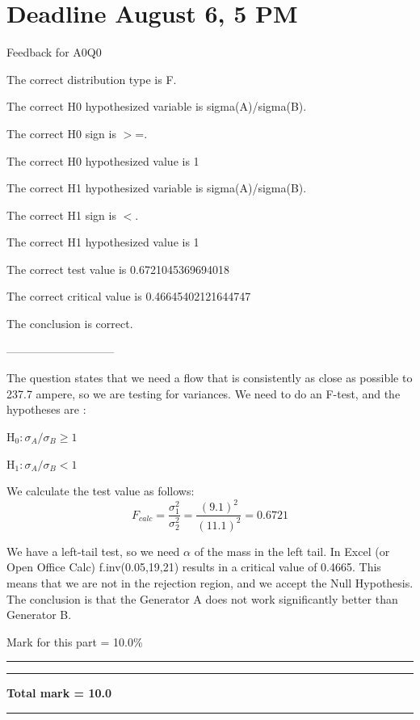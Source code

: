 \documentclass[a4paper,12pt]{CURSUS}
\begin{document}
\addtocounter{chapter}{-1}
\renewcommand{\chaptername}{Practice Class Assignment}
\chapter{Deadline August 6, 5 PM}

 Feedback for A0Q0

 The correct distribution type is F.

 The correct H0 hypothesized variable is sigma(A)/sigma(B).

 The correct H0 sign is $>$=.

 The correct H0 hypothesized value is 1

 The correct H1 hypothesized variable is sigma(A)/sigma(B).

 The correct H1 sign is $<$.

 The correct H1 hypothesized value is 1

 The correct test value is 0.6721045369694018

 The correct critical value is 0.46645402121644747

 The conclusion is correct.


 



 -----------------------------


 The question states that we need a flow that is consistently as close as possible to 237.7 ampere, so we are testing for variances.  We need to do an F-test, and the hypotheses are :

 H$_0:\sigma_A/\sigma_B \geq 1$

 H$_1:\sigma_A/\sigma_B < 1$

 We calculate the test value as follows:\begin{equation}F_{calc}=\displaystyle \frac{\sigma_1^2}{\sigma_2^2} = \displaystyle \frac{(9.1)^2}{(11.1)^2}=0.6721\end{equation}

 We have a left-tail test, so we need $\alpha$ of the mass in the left tail.  In Excel (or Open Office Calc) f.inv(0.05,19,21) results in a critical value of 0.4665.  This means that we are not in the rejection region, and we accept the Null Hypothesis.  The conclusion is that the Generator A does not work significantly better than Generator B.

 Mark for this part = 10.0\%

  \noindent\rule{8cm}{0.4pt} 

  \noindent\rule{8cm}{0.4pt} 

 \textbf{Total mark = 10.0}

  \noindent\rule{8cm}{0.4pt} 
\end{document}
